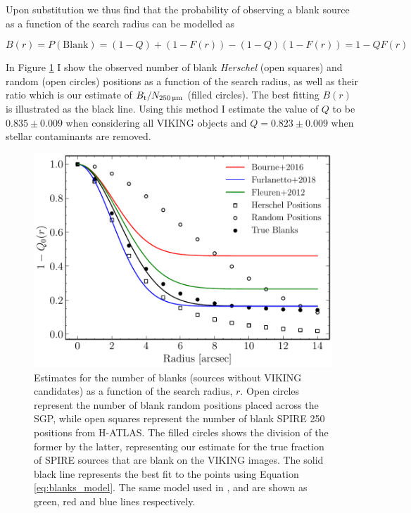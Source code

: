 Upon substitution we thus find that the probability of observing a blank source as a function of the search radius can be modelled as

\begin{equation}
    B(r) = P(\textrm{Blank}) = (1-Q) + (1-F(r)) - (1-Q)(1-F(r)) = 1 - QF(r)
\label{eq:blanks_model}
\end{equation}

In Figure \ref{fig:Q_estimate} I show the observed number of blank \textit{Herschel} (open squares) and random (open circles) positions as a function of the search radius, as well as their ratio which is our estimate of $B_{\textrm{t}}/N_{\textrm{250\,\micron}}$ (filled circles). The best fitting $B(r)$ is illustrated as the black line. Using this method I estimate the value of $Q$ to be $0.835\pm0.009$ when considering all VIKING objects and $Q=0.823\pm0.009$ when stellar contaminants are removed.

\begin{figure}
    \centering
	\includegraphics[width=\columnwidth]{Figures/Q_estimate.pdf}
	\caption{Estimates for the number of blanks (sources without VIKING candidates) as a function of the search radius, $r$. Open circles represent the number of blank random positions placed across the SGP, while open squares represent the number of blank SPIRE 250\,\micron positions from H-ATLAS. The filled circles shows the division of the former by the latter, representing our estimate for the true fraction of SPIRE sources that are blank on the VIKING images. The solid black line represents the best fit to the points using Equation \ref{eq:blanks_model}. The same model used in \citealt{Fleuren_2012}, \citealt{Bourne_2016} and \citealt{Furlanetto_2018} are shown as green, red and blue lines respectively.}
	\label{fig:Q_estimate}
\end{figure}

